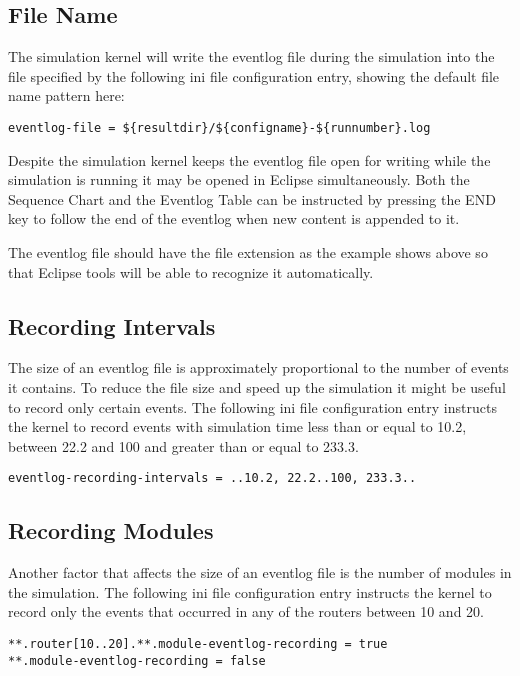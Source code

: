 \subsection{File Name}
The simulation kernel will write the eventlog file during the simulation into the
file specified by the following ini file configuration entry, showing the default
file name pattern here:
\begin{verbatim}
eventlog-file = ${resultdir}/${configname}-${runnumber}.log
\end{verbatim}
Despite the simulation kernel keeps the eventlog file open for writing while the
simulation is running it may be opened in Eclipse simultaneously. Both the
Sequence Chart and the Eventlog Table can be instructed by pressing the END
key to follow the end of the eventlog when new content is appended to it.
\begin{note}
The eventlog file should have the file extension
as the example shows above so that Eclipse tools will be able to recognize it
automatically.
\end{note}

\subsection{Recording Intervals}
The size of an eventlog file is approximately proportional to the number of events
it contains. To reduce the file size and speed up the simulation it might be
useful to record only certain events. The following ini file configuration entry
instructs the kernel to record events with simulation time less than or equal to
10.2, between 22.2 and 100 and greater than or equal to 233.3.
\begin{verbatim}
eventlog-recording-intervals = ..10.2, 22.2..100, 233.3..
\end{verbatim}

\subsection{Recording Modules}
Another factor that affects the size of an eventlog file is the number of modules
in the simulation. The following ini file configuration entry instructs the kernel
to record only the events that occurred in any of the routers between 10 and 20.
\begin{verbatim}
**.router[10..20].**.module-eventlog-recording = true
**.module-eventlog-recording = false
\end{verbatim}

